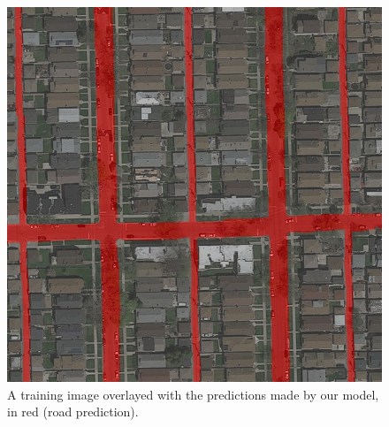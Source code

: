 \documentclass[10pt,conference,compsocconf]{IEEEtran}
\begin{document}
\begin{figure}[h]
	\centering
	\includegraphics[width=\columnwidth]{prediction.jpeg}
	\captionsetup{justification=centering, margin=0.2cm}
	\caption{A training image overlayed with the predictions made by our model, in red (road prediction).}
	\vspace{-4mm}
	\label{fig:comp}
\end{figure}



\end{document}
